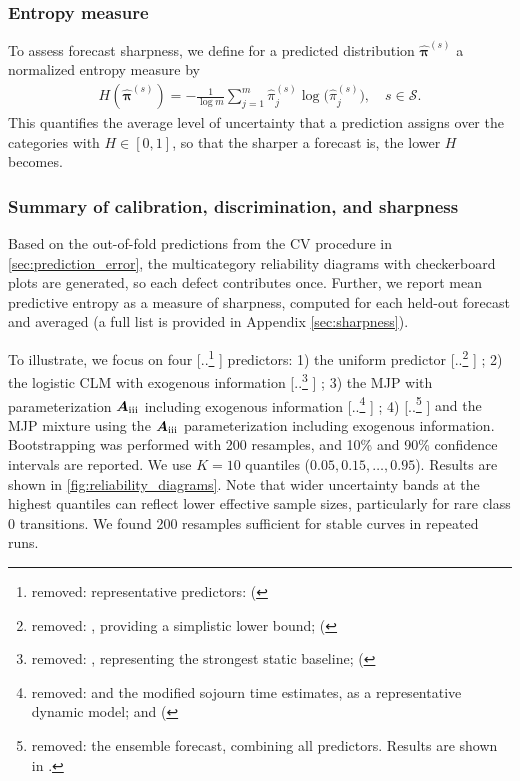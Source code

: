 \documentclass{article}
\newcommand{\RN}[1]{\textup{\uppercase\expandafter{\romannumeral#1}}}
\providecommand{\DIFadd}[1]{{\protect\color{blue} \sf #1}} %
\providecommand{\DIFdel}[1]{{\protect\color{red} [..\footnote{removed: #1} ]}} %
\providecommand{\DIFaddbegin}{} %
\providecommand{\DIFaddend}{} %
\providecommand{\DIFdelbegin}{} %
\providecommand{\DIFdelend}{} %
\begin{document}
\DIFaddbegin \subsubsection{\DIFadd{Entropy measure}}
\DIFadd{To assess forecast sharpness, we define for a predicted distribution $\widehat{\bm\pi}^{(s)}$ a normalized entropy measure by
}\begin{align}
H(\widehat{\bm\pi}^{(s)}) = - \frac{1}{\log m}\sum_{j=1}^{m}\widehat{\pi}^{(s)}_j \log\!\big(\widehat{\pi}^{(s)}_j\big), \quad s \in \mathcal S.\label{eq:entropy}
\end{align}
\DIFadd{This quantifies the average level of uncertainty that a prediction assigns over the categories with $H \in [0,1]$, so that the sharper a forecast is, the lower $H$ becomes.
}

\subsubsection{\DIFadd{Summary of calibration, discrimination, and sharpness}}
\DIFadd{Based on the out-of-fold predictions from the CV procedure in \cref{sec:prediction_error}, the multicategory reliability diagrams with checkerboard plots are generated, so each defect contributes once. Further, we report mean predictive entropy as a measure of sharpness, computed for each held-out forecast and averaged (a full list is provided in Appendix \ref{sec:sharpness}).
}

\DIFaddend To illustrate, we focus on four \DIFdelbegin \DIFdel{representative predictors: 
(}\DIFdelend \DIFaddbegin \DIFadd{predictors: 
}\DIFaddend 1) the uniform predictor\DIFdelbegin \DIFdel{, providing a simplistic lower bound; 
(}\DIFdelend \DIFaddbegin \DIFadd{; 
}\DIFaddend 2) the logistic CLM with exogenous information\DIFdelbegin \DIFdel{, representing the strongest static baseline; 
(}\DIFdelend \DIFaddbegin \DIFadd{; 
}\DIFaddend 3) the MJP with parameterization $\bm{A}_{\RN{3}}$ including exogenous information\DIFdelbegin \DIFdel{and the modified sojourn time estimates, as a representative dynamic model;
and 
(}\DIFdelend \DIFaddbegin \DIFadd{;
}\DIFaddend 4) \DIFdelbegin \DIFdel{the ensemble forecast, combining all predictors. 
Results are shown in \Cref{fig:reliability_diagrams}. }\DIFdelend \DIFaddbegin \DIFadd{and the MJP mixture using the $\bm{A}_{\RN{3}}$ parameterization including exogenous information. 
}\DIFaddend Bootstrapping was performed with 200 resamples, and 10\% and 90\% confidence intervals are reported. \DIFaddbegin \DIFadd{We use $K = 10$ quantiles ($0.05, 0.15, \dots, 0.95$). Results are shown in \cref{fig:reliability_diagrams}.
Note that wider uncertainty bands at the highest quantiles can reflect lower effective sample sizes, particularly for rare class $0$ transitions. We found 200 resamples sufficient for stable curves in repeated runs.
}\DIFaddend 
\end{document}
